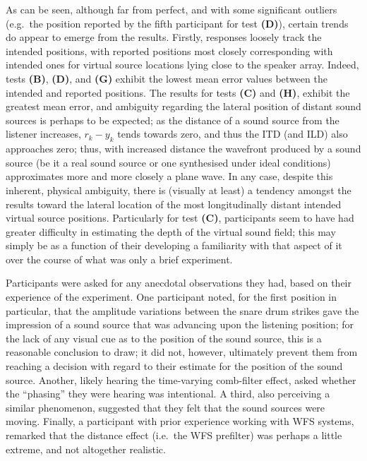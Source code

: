 As can be seen, although far from perfect, and with some significant
outliers (e.g.\ the position reported by the fifth participant for test
\textbf{(D)}), certain trends do appear to emerge from the results.
Firstly, responses loosely track the intended positions, with reported
positions most closely corresponding with intended ones for virtual source
locations lying close to the speaker array.
Indeed, tests \textbf{(B)}, \textbf{(D)}, and \textbf{(G)} exhibit the lowest
mean error values between the intended and reported positions.
The results for tests \textbf{(C)} and \textbf{(H)}, exhibit the greatest mean
error, and ambiguity regarding the lateral position of distant sound sources is
perhaps to be expected;
as the distance of a sound source from the listener increases, $r_k - y_k$
tends towards zero, and thus the ITD (and ILD) also approaches zero;
thus, with increased distance the wavefront produced by a sound source (be it a
real sound source or one synthesised under ideal conditions) approximates more
and more closely a plane wave.
In any case, despite this inherent, physical ambiguity, there is (visually
at least) a tendency amongst the results toward the lateral location of the
most longitudinally distant intended virtual source positions.
Particularly for test \textbf{(C)}, participants seem to have had greater
difficulty in estimating the depth of the virtual sound field; this may simply
be as a function of their developing a familiarity with that aspect of it over
the course of what was only a brief experiment.

Participants were asked for any anecdotal observations they had, based on their
experience of the experiment.
One participant noted, for the first position in particular, that the amplitude
variations between the snare drum strikes gave the impression of a sound source
that was advancing upon the listening position; for the lack of any visual cue
as to the position of the sound source, this is a reasonable conclusion to draw;
it did not, however, ultimately prevent them from reaching a decision with
regard to their estimate for the position of the sound source.
Another, likely hearing the time-varying comb-filter effect, asked whether the
``phasing'' they were hearing was intentional.
A third, also perceiving a similar phenomenon, suggested that they
felt that the sound sources were moving.
Finally, a participant with prior experience working with WFS systems, remarked
that the distance effect (i.e.\ the WFS prefilter) was perhaps a little extreme,
and not altogether realistic.

